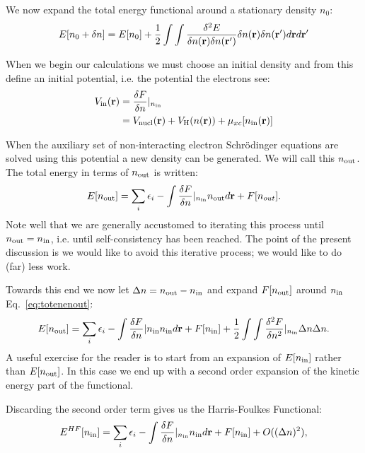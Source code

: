 We now expand the total energy functional around a stationary density $n_0$:
%
\begin{equation}
E[n_{0} + \delta n] = E[n_{0}] + \frac{1}{2}\int\int \frac{\delta^{2} E}{\delta n({\bf r}) \delta n({\bf r}')} \delta n({\bf r})\delta n({\bf r}')d{\bf r} d{\bf r}'
\end{equation}
%

When we begin our calculations we must choose an initial density and from this
define an initial potential, i.e. the potential the electrons see:
%
\begin{align}
V_{\rm in}({\bf r})  & = \frac{\delta F} {\delta n}|_{n_{\rm in}} \\
                & = V_{\rm nucl}({\bf r}) + V_{\rm H}(n({\bf r})) + \mu_{xc}[n_{\rm in}({\bf r})]
\end{align}
%

When the auxiliary set of non-interacting electron Schr\"odinger equations are solved using this potential
a new density can be generated. We will call this $n_{\rm out}$. The total energy in terms
of $n_{\rm out}$ is written:
%
\begin{equation}
\label{eq:totennout}
E[n_{\rm out}]= \sum_{i}\epsilon_{i} - \int \frac{\delta F}{\delta n}|_{n_{\rm in}} n_{\rm out} d{\bf r} + F[n_{out}].
\end{equation}
%
Note well that we are generally accustomed to iterating this process until $n_{\rm out}=n_{\rm in}$, i.e.
until self-consistency has been reached. The point of the present discussion is we would like
to avoid this iterative process; we would like to do (far) less work.


Towards this end we now let $\Delta n = n_{\rm out}-n_{\rm in}$ and expand $F[n_{\rm out}]$ 
around $n_{\rm in}$ Eq.~\ref{eq:totenenout}:
%
\begin{equation}
\label{eq:toten2}
	E[n_{\rm out}]= \sum_{i}\epsilon_{i} - \int \frac{\delta F}{\delta n}|{n_{\rm in}}n_{\rm in} d{\bf r} + F[n_{\rm in }] 
+ \frac{1}{2}\int\int  \frac{\delta^{2} F}{\delta n^2}|_{n_{\rm in}}\Delta n \Delta n.
\end{equation}
%
A useful exercise for the reader is to start from an expansion of $E[n_{\rm in}]$
rather than $E[n_{\rm out}]$. In this case we end up with a second order expansion 
of the kinetic energy part of the functional. 

Discarding the second order term gives us the Harris-Foulkes Functional: 
%
\begin{equation}
\label{eq:HF}
	E^{HF}[n_{\rm in}] = \sum_{i}\epsilon_{i} - \int \frac{\delta F}{\delta n}|_{n_{\rm in}}n_{\rm in} d{\bf r} + F[n_{\rm in }] + O((\Delta n)^{2}), 
\end{equation}
%


